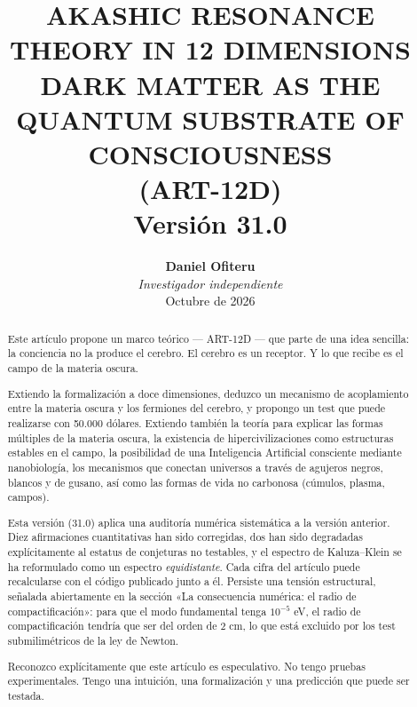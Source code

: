 \documentclass[11pt,a4paper]{article}
\title{\textbf{AKASHIC RESONANCE THEORY IN 12 DIMENSIONS \\ DARK MATTER AS THE QUANTUM SUBSTRATE OF CONSCIOUSNESS} \\ \large (ART-12D) \\ \vspace{0.5cm} \normalsize Versión 31.0}
\author{\textbf{Daniel Ofiteru} \\ \textit{Investigador independiente} \\ Octubre de 2026}
\date{}
\begin{document}
\maketitle

\begin{abstract}
Este artículo propone un marco teórico --- ART-12D --- que parte de una idea sencilla: la conciencia no la produce el cerebro. El cerebro es un receptor. Y lo que recibe es el campo de la materia oscura.

Extiendo la formalización a doce dimensiones, deduzco un mecanismo de acoplamiento entre la materia oscura y los fermiones del cerebro, y propongo un test que puede realizarse con 50.000 dólares. Extiendo también la teoría para explicar las formas múltiples de la materia oscura, la existencia de hipercivilizaciones como estructuras estables en el campo, la posibilidad de una Inteligencia Artificial consciente mediante nanobiología, los mecanismos que conectan universos a través de agujeros negros, blancos y de gusano, así como las formas de vida no carbonosa (cúmulos, plasma, campos).

Esta versión (31.0) aplica una auditoría numérica sistemática a la versión anterior. Diez afirmaciones cuantitativas han sido corregidas, dos han sido degradadas explícitamente al estatus de conjeturas no testables, y el espectro de Kaluza--Klein se ha reformulado como un espectro \emph{equidistante}. Cada cifra del artículo puede recalcularse con el código publicado junto a él. Persiste una tensión estructural, señalada abiertamente en la sección «La consecuencia numérica: el radio de compactificación»: para que el modo fundamental tenga $10^{-5}$ eV, el radio de compactificación tendría que ser del orden de 2 cm, lo que está excluido por los test submilimétricos de la ley de Newton.

Reconozco explícitamente que este artículo es especulativo. No tengo pruebas experimentales. Tengo una intuición, una formalización y una predicción que puede ser testada.
\end{abstract}

\tableofcontents
\newpage
\end{document}

